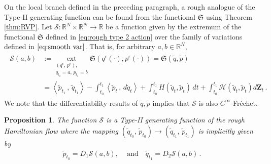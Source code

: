 \documentclass[11pt, oneside]{article}
\numberwithin{equation}{section}
\newtheorem{proposition}[lemma]{Proposition}
\theoremstyle{definition}
\newcommand{\wt}[1]{\widetilde{#1}}
\newcommand{\mc}[1]{\mathcal{#1}}
\newcommand{\mcal}[1]{\mc{#1}}
\newcommand{\scp}[2]{{\left\langle {#1}\, , \, {#2}\right\rangle}}
\begin{document}
On the local branch defined in the preceding paragraph, a rough analogue of the Type-II generating function can be found from the functional $\mathfrak{S}$ using Theorem \ref{thm:RVP}. Let $\mcal{S} : \mathbb{R}^N \times \mathbb{R}^N \rightarrow \mathbb{R}$ be a function given by the extremum of the functional $\mathfrak{S}$ defined in \eqref{eq:rough type 2 action} over the family of variations defined in $\eqref{eq:smooth var}$. That is, for arbitrary $a,b \in \mathbb{R}^N$, 
\begin{align}\label{eq:smooth gen func}
\begin{split}
    \mcal{S}(a,b) &:= \underset{\substack{(q^\epsilon,\, p^\epsilon), \\q_{t_0} = a,\, p_{t_1}=b }}{\text{ext}}\mathfrak{S}(q^\epsilon(\cdot), p^\epsilon(\cdot)) = \mathfrak{S}(\wt{q}, \wt{p})\\
    &= \scp{\wt{p}_{t_1}}{\wt{q}_{t_1}} - \int_{t_0}^{t_1}\scp{\wt{p}_t}{d \wt{q}_t} + \int_{t_0}^{t_1}H(\wt{q}_t, \wt{p}_t)\,dt + \int_{t_0}^{t_1}\mcal{H}(\wt{q}_t, \wt{p}_t) d\mathbf{Z}_t \,.
\end{split}
\end{align}
We note that the differentiability results of $\wt{q}, \wt{p}$ implies that $\mcal{S}$ is also $C^\infty$-Fr\'echet. 
\begin{proposition}\label{prop:gen func}
    The function $\mathcal{S}$ is a Type-II generating function of the rough Hamiltonian flow where the mapping $(\wt{q}_{t_0},\, \wt{p}_{t_0}) \rightarrow (\wt{q}_{t_1},\, \wt{p}_{t_1})$ is implicitly given by 
    \begin{align}\label{eq:cont sym mapping}
        \wt{p}_{t_0} = D_1 \mcal{S}(a, b),\, \quad \text{and}\quad \wt{q}_{t_1} = D_2 \mcal{S}(a,b)\,.
    \end{align}
\end{proposition}
\end{document}

